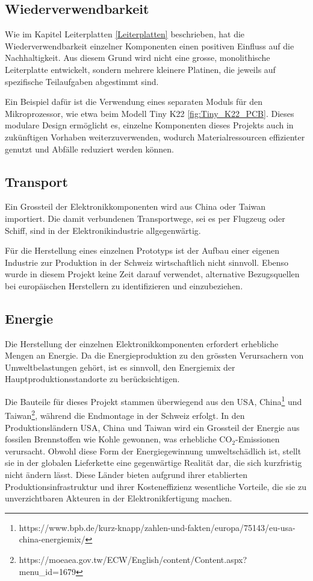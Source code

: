 \subsection{Wiederverwendbarkeit}

Wie im Kapitel Leiterplatten \ref{Leiterplatten} beschrieben, hat die Wiederverwendbarkeit einzelner Komponenten einen positiven Einfluss auf die Nachhaltigkeit. Aus diesem Grund wird nicht eine grosse, monolithische Leiterplatte entwickelt, sondern mehrere kleinere Platinen, die jeweils auf spezifische Teilaufgaben abgestimmt sind.

Ein Beispiel dafür ist die Verwendung eines separaten Moduls für den Mikroprozessor, wie etwa beim Modell Tiny K22 \ref{fig:Tiny_K22_PCB}. Dieses modulare Design ermöglicht es, einzelne Komponenten dieses Projekts auch in zukünftigen Vorhaben weiterzuverwenden, wodurch Materialressourcen effizienter genutzt und Abfälle reduziert werden können.

\subsection{Transport}

Ein Grossteil der Elektronikkomponenten wird aus China oder Taiwan importiert. Die damit verbundenen Transportwege, sei es per Flugzeug oder Schiff, sind in der Elektronikindustrie allgegenwärtig.

Für die Herstellung eines einzelnen Prototyps ist der Aufbau einer eigenen Industrie zur Produktion in der Schweiz wirtschaftlich nicht sinnvoll. Ebenso wurde in diesem Projekt keine Zeit darauf verwendet, alternative Bezugsquellen bei europäischen Herstellern zu identifizieren und einzubeziehen.

\subsection{Energie}

Die Herstellung der einzelnen Elektronikkomponenten erfordert erhebliche Mengen an Energie. Da die Energieproduktion zu den grössten Verursachern von Umweltbelastungen gehört, ist es sinnvoll, den Energiemix der Hauptproduktionsstandorte zu berücksichtigen.

Die Bauteile für dieses Projekt stammen überwiegend aus den USA, China\footnote{https://www.bpb.de/kurz-knapp/zahlen-und-fakten/europa/75143/eu-usa-china-energiemix/} und Taiwan\footnote{https://moeaea.gov.tw/ECW/English/content/Content.aspx?menu_id=1679}, während die Endmontage in der Schweiz erfolgt. In den Produktionsländern USA, China und Taiwan wird ein Grossteil der Energie aus fossilen Brennstoffen wie Kohle gewonnen, was erhebliche CO$_{2}$-Emissionen verursacht. Obwohl diese Form der Energiegewinnung umweltschädlich ist, stellt sie in der globalen Lieferkette eine gegenwärtige Realität dar, die sich kurzfristig nicht ändern lässt. Diese Länder bieten aufgrund ihrer etablierten Produktionsinfrastruktur und ihrer Kosteneffizienz wesentliche Vorteile, die sie zu unverzichtbaren Akteuren in der Elektronikfertigung machen.

